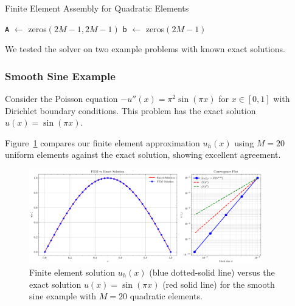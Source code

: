 \begin{algorithm}[H]
	\caption{Finite Element Assembly for Quadratic Elements}
	\label{alg:FEM_assembly}
	\BlankLine
	\texttt{A} \(\leftarrow\) zeros\((2M-1, 2M-1)\)\;
	\texttt{b} \(\leftarrow\) zeros\((2M-1)\)\;
	\BlankLine
	\BlankLine
\end{algorithm}

We tested the solver on two example problems with known exact solutions.

\subsubsection*{Smooth Sine Example}
Consider the Poisson equation $-u''(x) = \pi^2 \sin(\pi x)$ for $x \in [0,1]$ with Dirichlet boundary conditions. This problem has the exact solution $u(x) = \sin(\pi x)$.

Figure~\ref{fig:solution_sine} compares our finite element approximation $u_h(x)$ using $M=20$ uniform elements against the exact solution, showing excellent agreement.
\begin{figure}[H]
	\centering
	\includegraphics[width=0.9\textwidth]{figures/fem_plot_convergence_sine_M20.png}
	\caption{Finite element solution \(u_h(x)\) (blue dotted-solid line) versus the exact solution \(u(x)=\sin(\pi x)\) (red solid line) for the smooth sine example with \(M=20\) quadratic elements.}
	\label{fig:solution_sine}
\end{figure}

